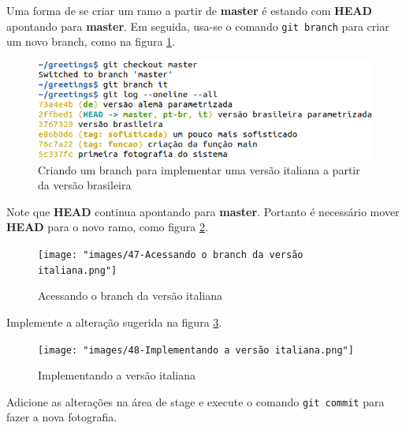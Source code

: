 \documentclass[a4paper]{book}
\begin{document}
Uma forma de se criar um ramo a partir de \textbf{master}
é estando com \textbf{HEAD} apontando para \textbf{master}.
Em seguida, usa-se o comando \texttt{git branch} para 
criar um novo branch, como na figura \ref{fig:46}.

\begin{figure}[ht]
\caption{Criando um branch para implementar uma versão italiana a partir da versão brasileira}
\label{fig:46}
\centering
\includegraphics[scale=0.6,left]{"images/46-Criando um branch para implementar uma versão italiana a partir da versão brasileira.png"}
\end{figure}

Note que \textbf{HEAD} continua apontando para
\textbf{master}.
Portanto é necessário mover \textbf{HEAD} para o novo
ramo, como figura \ref{fig:47}.

\begin{figure}[ht]
\caption{Acessando o branch da versão italiana}
\label{fig:47}
\centering
\texttt{[image: "images/47-Acessando o branch da versão italiana.png"]}
\end{figure}

Implemente a alteração sugerida na figura \ref{fig:48}.

\begin{figure}[ht]
\caption{Implementando a versão italiana}
\label{fig:48}
\centering
\texttt{[image: "images/48-Implementando a versão italiana.png"]}
\end{figure}

Adicione as alterações na área de stage e execute
o comando \texttt{git commit} para fazer a nova fotografia.

%

\newpage
\end{document}
